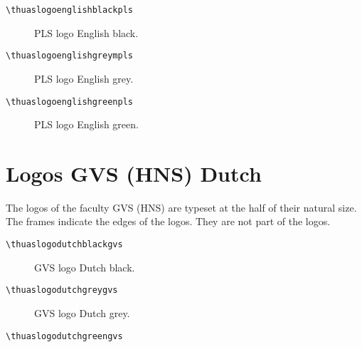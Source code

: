 \documentclass[a4paper,12pt]{article}
\begin{document}
\begin{verbatim}
\thuaslogoenglishblackpls
\end{verbatim}

\begin{figure}[H]
\centering\fboxsep=0pt%
\fbox{%
\scalebox{0.7071}{\thuaslogoenglishblackpls}}
\caption{PLS logo English black.}
\end{figure}

\begin{verbatim}
\thuaslogoenglishgreympls
\end{verbatim}

\begin{figure}[H]
\centering\fboxsep=0pt%
\fbox{%
\scalebox{0.7071}{\thuaslogoenglishgreypls}}
\caption{PLS logo English grey.}
\end{figure}

\begin{verbatim}
\thuaslogoenglishgreenpls
\end{verbatim}

\begin{figure}[H]
\centering\fboxsep=0pt%
\fbox{%
\scalebox{0.7071}{\thuaslogoenglishgreenpls}}
\caption{PLS logo English green.}
\end{figure}


\section{Logos GVS (HNS) Dutch}
The logos of the faculty GVS (HNS) are typeset at the half of their natural size.
The frames indicate the edges of the logos. They are not part of the logos.

\begin{verbatim}
\thuaslogodutchblackgvs
\end{verbatim}

\begin{figure}[H]
\centering\fboxsep=0pt%
\fbox{%
\scalebox{0.7071}{\thuaslogodutchblackgvs}}
\caption{GVS logo Dutch black.}
\end{figure}

\begin{verbatim}
\thuaslogodutchgreygvs
\end{verbatim}

\begin{figure}[H]
\centering\fboxsep=0pt%
\fbox{%
\scalebox{0.7071}{\thuaslogodutchgreygvs}}
\caption{GVS logo Dutch grey.}
\end{figure}

\begin{verbatim}
\thuaslogodutchgreengvs
\end{verbatim}
\end{document}
